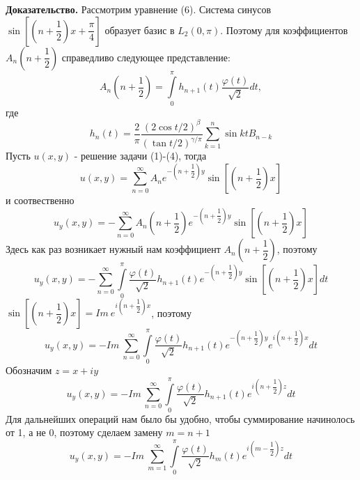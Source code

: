 \documentclass[12pt, a4paper]{article}
\begin{document}
\textbf{Доказательство.} 
	\newline
	Рассмотрим уравнение (6). Система синусов $\sin{\left[\left(n +\dfrac12\right)x + \dfrac\pi4\right]}$ образует базис в $L_2(0,\pi)$. Поэтому для коэффициентов $A_n\left(n+\dfrac12\right)$ справедливо следующее представление:
	\begin{equation*}
		A_n\left(n+\dfrac12\right) = \int\limits_0^\pi h_{n+1}(t) \dfrac{\varphi(t)}{\sqrt2} dt, 
	\end{equation*}
	где
	\begin{equation*}
		h_n(t) = \dfrac{2}{\pi}\dfrac{(2\cos{t/2})^\beta}{(\tan{t/2})^{\gamma/\pi}} \sum\limits_{k=1}^n \sin{kt} B_{n-k}
	\end{equation*}
	Пусть $u(x,y)$ - решение задачи (1)-(4), тогда
	\begin{equation*}
		u(x,y) = \sum\limits_{n=0}^{\infty} A_n e^{-\left(n + \dfrac12\right)y} \sin{\left[\left(n + \dfrac12\right)x\right]}
	\end{equation*}
	и соотвественно
	\begin{equation*}
		u_y(x,y) = -\sum\limits_{n=0}^{\infty} A_n \left(n +\dfrac12\right) e^{-\left(n + \dfrac12\right)y} \sin{\left[\left(n + \dfrac12\right)x\right]}
	\end{equation*}
	Здесь как раз возникает нужный нам коэффициент $A_n \left(n+\dfrac12\right)$, поэтому
	\begin{equation*}
		u_y(x,y)  = - \sum\limits_{n=0}^{\infty}  \int\limits_0^\pi \dfrac{\varphi(t)}{\sqrt2}  h_{n+1}(t)  e^{-\left(n + \dfrac12\right)y} \sin{\left[\left(n + \dfrac12\right)x\right]} dt
	\end{equation*}
	$\sin{\left[\left(n + \dfrac12\right)x\right]} = Im \ e^{i\left(n + \dfrac12\right)x}$, поэтому
	\begin{equation*}
		u_y(x,y)  = -  Im \ \sum\limits_{n=0}^{\infty}  \int\limits_0^\pi \dfrac{\varphi(t)}{\sqrt2}  h_{n+1}(t)  e^{-\left(n + \dfrac12\right)y} e^{i\left(n + \dfrac12\right)x} dt
	\end{equation*}
	Обозначим $z = x + iy$
	\begin{equation*}
		u_y(x,y)  = -  Im \ \sum\limits_{n=0}^{\infty}  \int\limits_0^\pi \dfrac{\varphi(t)}{\sqrt2}  h_{n+1}(t)  e^{i\left(n+\dfrac12\right) z}  dt
	\end{equation*}
	Для дальнейших операций нам было бы удобно, чтобы суммирование начинолось от 1, а не 0, поэтому сделаем замену $m = n +1$
	\begin{equation*}
		u_y(x,y)  = -  Im \ \sum\limits_{m=1}^{\infty}  \int\limits_0^\pi \dfrac{\varphi(t)}{\sqrt2}  h_{m}(t)  e^{i\left(m-\dfrac12\right) z}  dt
	\end{equation*}
\end{document}
